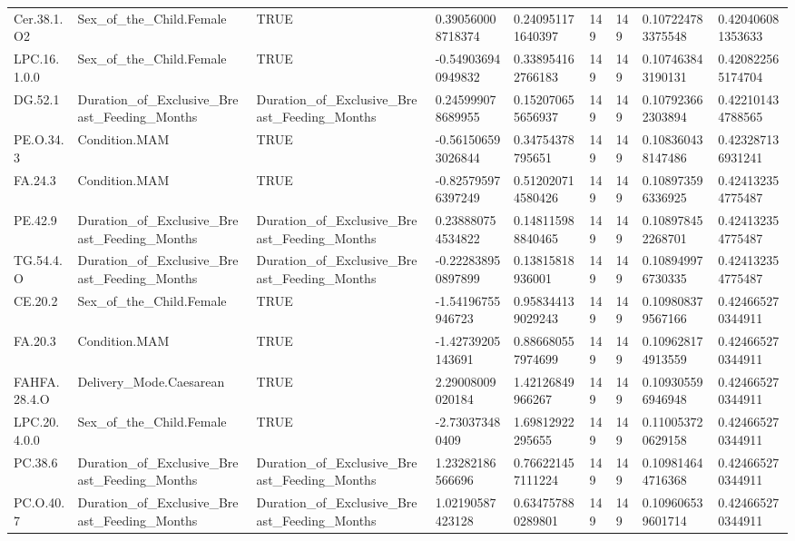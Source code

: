 \begin{longtable}{lllllllll}
Cer.38.1.O2 & Sex\_of\_the\_Child.Female & TRUE & 0.390560008718374 & 0.240951171640397 & 149 & 149 & 0.107224783375548 & 0.420406081353633 \\
LPC.16.1.0.0 & Sex\_of\_the\_Child.Female & TRUE & -0.549036940949832 & 0.338954162766183 & 149 & 149 & 0.107463843190131 & 0.420822565174704 \\
DG.52.1 & Duration\_of\_Exclusive\_Breast\_Feeding\_Months & Duration\_of\_Exclusive\_Breast\_Feeding\_Months & 0.245999078689955 & 0.152070655656937 & 149 & 149 & 0.107923662303894 & 0.422101434788565 \\
PE.O.34.3 & Condition.MAM & TRUE & -0.561506593026844 & 0.34754378795651 & 149 & 149 & 0.108360438147486 & 0.423287136931241 \\
FA.24.3 & Condition.MAM & TRUE & -0.825795976397249 & 0.512020714580426 & 149 & 149 & 0.108973596336925 & 0.424132354775487 \\
PE.42.9 & Duration\_of\_Exclusive\_Breast\_Feeding\_Months & Duration\_of\_Exclusive\_Breast\_Feeding\_Months & 0.238880754534822 & 0.148115988840465 & 149 & 149 & 0.108978452268701 & 0.424132354775487 \\
TG.54.4.O & Duration\_of\_Exclusive\_Breast\_Feeding\_Months & Duration\_of\_Exclusive\_Breast\_Feeding\_Months & -0.222838950897899 & 0.13815818936001 & 149 & 149 & 0.108949976730335 & 0.424132354775487 \\
CE.20.2 & Sex\_of\_the\_Child.Female & TRUE & -1.54196755946723 & 0.958344139029243 & 149 & 149 & 0.109808379567166 & 0.424665270344911 \\
FA.20.3 & Condition.MAM & TRUE & -1.42739205143691 & 0.886680557974699 & 149 & 149 & 0.109628174913559 & 0.424665270344911 \\
FAHFA.28.4.O & Delivery\_Mode.Caesarean & TRUE & 2.29008009020184 & 1.42126849966267 & 149 & 149 & 0.109305596946948 & 0.424665270344911 \\
LPC.20.4.0.0 & Sex\_of\_the\_Child.Female & TRUE & -2.730373480409 & 1.69812922295655 & 149 & 149 & 0.110053720629158 & 0.424665270344911 \\
PC.38.6 & Duration\_of\_Exclusive\_Breast\_Feeding\_Months & Duration\_of\_Exclusive\_Breast\_Feeding\_Months & 1.23282186566696 & 0.766221457111224 & 149 & 149 & 0.109814644716368 & 0.424665270344911 \\
PC.O.40.7 & Duration\_of\_Exclusive\_Breast\_Feeding\_Months & Duration\_of\_Exclusive\_Breast\_Feeding\_Months & 1.02190587423128 & 0.634757880289801 & 149 & 149 & 0.109606539601714 & 0.424665270344911 \\

\end{longtable}
